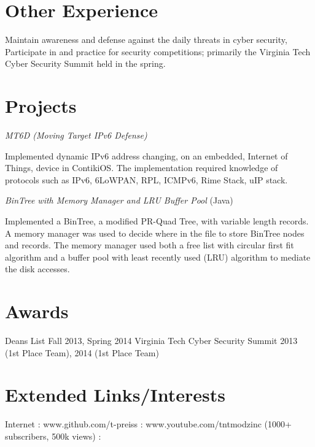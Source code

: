 \documentclass{tpreiss_cv}
\begin{document}
\section{Other Experience} 
Maintain awareness and defense against the daily threats in cyber security, Participate in and practice for security competitions; primarily the Virginia Tech Cyber Security Summit held in the spring.

\section{Projects}


\textit{MT6D (Moving Target IPv6 Defense)}

Implemented dynamic IPv6 address changing, on an embedded, Internet of Things, device in ContikiOS. The implementation required knowledge of protocols such as IPv6, 6LoWPAN, RPL, ICMPv6, Rime Stack, uIP stack.

\textit{BinTree with Memory Manager and LRU Buffer Pool} (Java)

Implemented a BinTree, a modified PR-Quad Tree, with variable length records. A memory manager was used to decide where in the file to store BinTree nodes and records. The memory manager used both a free list with circular first fit algorithm and a buffer pool with least recently used (LRU) algorithm to mediate the disk accesses.

\section{Awards}
Deans List Fall 2013, Spring 2014                  
Virginia Tech Cyber Security Summit 2013 (1st Place Team), 2014 (1st Place Team)

\section{Extended Links/Interests}

Internet : www.github.com/t-preiss  :  www.youtube.com/tntmodzinc  (1000+ subscribers, 500k views) :
\end{document}
